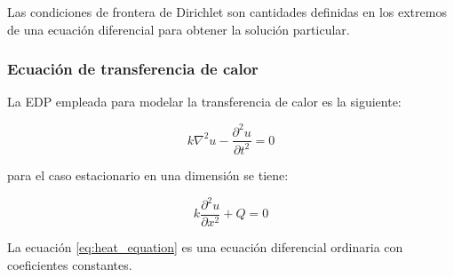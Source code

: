 Las condiciones de frontera de Dirichlet son cantidades definidas en los extremos de una ecuación diferencial para obtener la solución particular.

\subsubsection{Ecuación de transferencia de calor}

La EDP empleada para modelar la transferencia de calor es la siguiente:

\begin{equation*}
    k \nabla^2 u - \frac{\partial^2 u}{\partial t^2} = 0
\end{equation*}

para el caso estacionario en una dimensión se tiene:

\begin{equation}
    k\frac{\partial^2 u}{\partial x^2} +Q = 0 \label{eq:heat_equation}
\end{equation}

La ecuación \ref{eq:heat_equation} es una ecuación diferencial ordinaria con coeficientes constantes.


